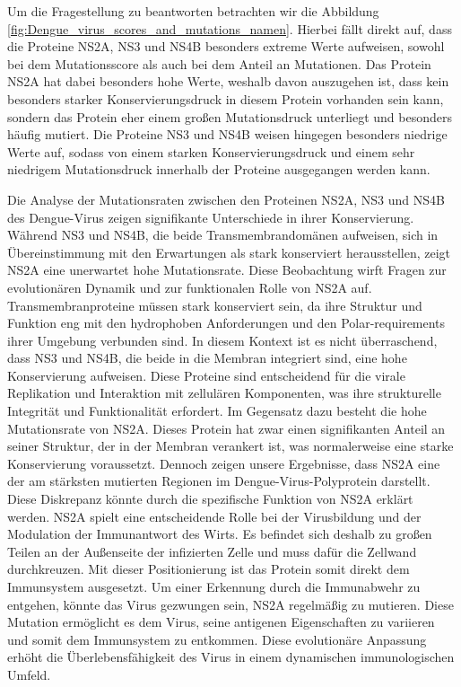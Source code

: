 \documentclass[german,version-2022-01]{uzl-thesis}
\begin{document}
Um die Fragestellung zu beantworten betrachten wir die Abbildung \ref{fig:Dengue_virus_scores_and_mutations_namen}. Hierbei f\"allt direkt auf, dass die Proteine NS2A, NS3 und NS4B besonders extreme Werte aufweisen, sowohl bei dem Mutationsscore als auch bei dem Anteil an Mutationen. Das Protein NS2A hat dabei besonders hohe Werte, weshalb davon auszugehen ist, dass kein besonders starker Konservierungsdruck in diesem Protein vorhanden sein kann, sondern das Protein eher einem gro\ss{}en Mutationsdruck unterliegt und besonders h\"aufig mutiert. Die Proteine NS3 und NS4B weisen hingegen besonders niedrige Werte auf, sodass von einem starken Konservierungsdruck und einem sehr niedrigem Mutationsdruck innerhalb der Proteine ausgegangen werden kann. 

Die Analyse der Mutationsraten zwischen den Proteinen NS2A, NS3 und NS4B des Dengue-Virus zeigen signifikante Unterschiede in ihrer Konservierung. W\"ahrend NS3 und NS4B, die beide Transmembrandom\"anen aufweisen, sich in \"Ubereinstimmung mit den Erwartungen als stark konserviert herausstellen, zeigt NS2A eine unerwartet hohe Mutationsrate. Diese Beobachtung wirft Fragen zur evolution\"aren Dynamik und zur funktionalen Rolle von NS2A auf. Transmembranproteine m\"ussen stark konserviert sein, da ihre Struktur und Funktion eng mit den hydrophoben Anforderungen und den Polar-requirements ihrer Umgebung verbunden sind. In diesem Kontext ist es nicht \"uberraschend, dass NS3 und NS4B, die beide in die Membran integriert sind, eine hohe Konservierung aufweisen. Diese Proteine sind entscheidend f\"ur die virale Replikation und Interaktion mit zellul\"aren Komponenten, was ihre strukturelle Integrit\"at und Funktionalit\"at erfordert. Im Gegensatz dazu besteht die hohe Mutationsrate von NS2A. Dieses Protein hat zwar einen signifikanten Anteil an seiner Struktur, der in der Membran verankert ist, was normalerweise eine starke Konservierung voraussetzt. Dennoch zeigen unsere Ergebnisse, dass NS2A eine der am st\"arksten mutierten Regionen im Dengue-Virus-Polyprotein darstellt. Diese Diskrepanz k\"onnte durch die spezifische Funktion von NS2A erkl\"art werden. NS2A spielt eine entscheidende Rolle bei der Virusbildung und der Modulation der Immunantwort des Wirts. Es befindet sich deshalb zu gro\ss{}en Teilen an der Au\ss{}enseite der infizierten Zelle und muss daf\"ur die Zellwand durchkreuzen. Mit dieser Positionierung ist das Protein somit direkt dem Immunsystem ausgesetzt. Um einer Erkennung durch die Immunabwehr zu entgehen, k\"onnte das Virus gezwungen sein, NS2A regelm\"a\ss{}ig zu mutieren. Diese Mutation erm\"oglicht es dem Virus, seine antigenen Eigenschaften zu variieren und somit dem Immunsystem zu entkommen. Diese evolution\"are Anpassung erh\"oht die \"Uberlebensf\"ahigkeit des Virus in einem dynamischen immunologischen Umfeld.
\end{document}
